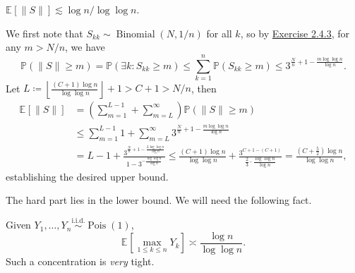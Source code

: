 \begin{answer}
\begin{enumerate}[(a)]
		      \begin{claim}
			      \(\mathbb{E}_{}[\lVert S \rVert ] \lesssim \log n / \log \log n\).
		      \end{claim}
		      \begin{explanation}
			      We first note that \(S_{kk} \sim \operatorname{Binomial}(N, 1 / n) \) for all \(k\), so by \hyperref[ex2.4.3]{Exercise 2.4.3}, for any \(m > N / n\), we have
			      \[
				      \mathbb{P} (\lVert S \rVert \geq m)
				      = \mathbb{P} (\exists k \colon S_{k k} \geq m)
				      \leq \sum_{k=1}^{n} \mathbb{P} (S_{k k} \geq m)
				      \leq 3^{\frac{N}{n} + 1 - \frac{m \log \log n}{\log n}}.
			      \]
			      Let \(L\coloneqq \left\lfloor \frac{(C+1) \log n}{\log \log n} \right\rfloor + 1 > C + 1 > N / n\), then
			      \[
				      \begin{split}
					      \mathbb{E}_{}[\lVert S \rVert ]
					       & = \left( \sum_{m=1}^{L-1} + \sum_{m=L}^{\infty} \right) \mathbb{P} (\lVert S \rVert \geq m)               \\
					       & \leq \sum_{m=1}^{L-1} 1 + \sum_{m=L}^{\infty} 3^{\frac{N}{n} + 1 - \frac{m \log \log n}{\log n}}          \\
					       & = L - 1 + \frac{3^{\frac{N}{n} + 1 - \frac{L \log \log n}{\log n}}}{1 - 3^{- \frac{\log \log n}{\log n}}}
					      \leq \frac{(C+1) \log n}{\log \log n} + \frac{3^{C + 1 - (C+1)}}{\frac{2}{3} \cdot \frac{\log \log n}{\log n}}
					      = \frac{(C + \frac{5}{2}) \log n}{\log \log n},
				      \end{split}
			      \]
			      establishing the desired upper bound.
		      \end{explanation}

		      The hard part lies in the lower bound. We will need the following fact.

		      \begin{lemma}\label{lma:maximum-Poisson}
			      Given \(Y_1, \dots , Y_n \overset{\text{i.i.d.} }{\sim } \operatorname{Pois}(1) \),
			      \[
				      \mathbb{E}_{}\left[ \max _{1 \leq k \leq n} Y_k \right]
				      \asymp \frac{\log n}{\log \log n}.
			      \]
			      Such a concentration is \emph{very} tight.
		      \end{lemma}


\end{enumerate}
\end{answer}
